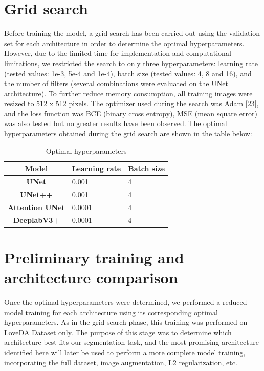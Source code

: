 \section{Grid search}
Before training the model, a grid search has been carried out using the validation set for each architecture in order to determine the optimal hyperparameters. However, due to the limited time for implementation and computational limitations, we restricted the search to only three hyperparameters: learning rate (tested values: 1e‑3, 5e‑4 and 1e‑4), batch size (tested values: 4, 8 and 16), and the number of filters (several combinations were evaluated on the UNet architecture). To further reduce memory consumption, all training images were resized to 512 x 512 pixels. The optimizer used during the search was Adam [23], and the loss function was BCE (binary cross entropy), MSE (mean square error) was also tested but no greater results have been observed. The optimal hyperparameters obtained during the grid search are shown in the table below:
\begin{table}[H]
\centering
\begin{tabular}{|c|l|l|}
\hline
\textbf{Model}            & \multicolumn{1}{c|}{\textbf{Learning rate}} & \multicolumn{1}{c|}{\textbf{Batch size}} \\ \hline
\textbf{UNet}           & 0.001                                       & 4                                        \\ \hline
\textbf{UNet++}         & 0.001                                       & 4                                        \\ \hline
\textbf{Attention UNet} & 0.0001                                      & 4                                        \\ \hline
\textbf{DeeplabV3+}     & 0.0001                                      & 4                                        \\ \hline
\end{tabular}
\caption{Optimal hyperparameters}
\label{tab:my-table}
\end{table}



\section{Preliminary training and architecture comparison}
Once the optimal hyperparameters were determined, we performed a reduced model training for each architecture using its corresponding optimal hyperparameters. As in the grid search phase, this training was performed on LoveDA Dataset only. The purpose of this stage was to determine which architecture best fits our segmentation task, and the most promising architecture identified here will later be used to perform a more complete model training, incorporating the full dataset, image augmentation, L2 regularization, etc.\\


